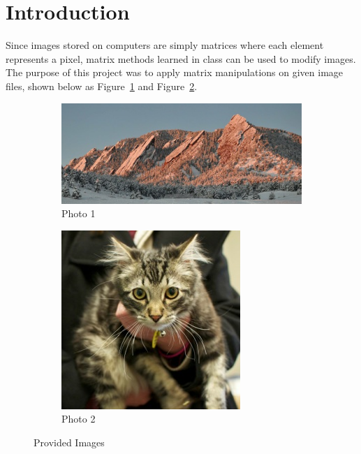 \section*{Introduction}
Since images stored on computers are simply matrices where each element
represents a pixel, matrix methods learned in class can be used to
modify images. The purpose of this project was to apply matrix manipulations
on given image files, shown below as Figure~\ref{fig:p1} and
Figure~\ref{fig:p2}.

\begin{figure}[ht]
  \centering
  \begin{subfigure}{\textwidth}
    \centering
    \includegraphics[scale=0.4]{./img/photo1.png}
    \caption{Photo 1}
    \label{fig:p1}
  \end{subfigure}
  \begin{subfigure}{\textwidth}
    \centering
    \includegraphics[scale=0.4]{./img/photo2.png}
    \caption{Photo
    2}
    \label{fig:p2}
  \end{subfigure}
  \caption{Provided
  Images}
  \label{fig:init_image}
\end{figure}

